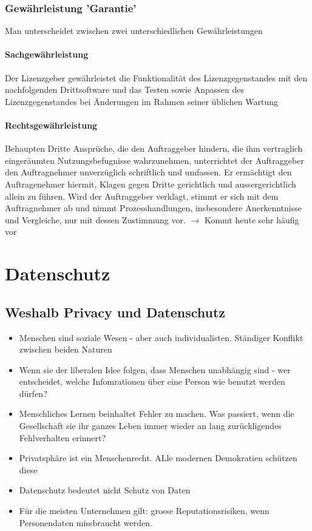 \documentclass{report}
\theoremstyle{definition}
\theoremstyle{example}
\begin{document}
\subsection{Gewährleistung 'Garantie'}
Man unterscheidet zwischen zwei unterschiedlichen Gewährleistungen

\subsubsection{Sachgewährleistung}
Der Lizenzgeber gewährleistet die Funktionalität des Lizenzgegenstandes mit den nachfolgenden Drittsoftware und das Testen sowie Anpassen des Lizenzgegenstandes bei Änderungen im Rahmen seiner üblichen Wartung

\subsubsection{Rechtsgewährleistung}
Behaupten Dritte Ansprüche, die den Auftraggeber hindern, die ihm vertraglich eingeräumten Nutzungsbefugnisse wahrzunehmen, unterrichtet der Auftraggeber den Auftragnehmer unverzüglich schriftlich und umfassen. Er ermächtigt den Auftragenehmer hiermit, Klagen gegen Dritte
gerichtlich und aussergerichtlich allein zu führen. Wird der Auftraggeber verklagt, stimmt er sich mit dem Auftragnehmer ab und nimmt Prozesshandlungen, insbesondere Anerkenntnisse und Vergleiche, nur mit dessen Zustimmung vor.
$\rightarrow$ Kommt heute sehr häufig vor



\chapter{Datenschutz}

\section{Weshalb Privacy und Datenschutz}
\begin{itemize}
   \item Menschen sind soziale Wesen - aber auch individualisten. Ständiger Konflikt zwischen beiden Naturen
   \item Wenn sie der liberalen Idee folgen, dass Menschen unabhängig sind - wer entscheidet, welche Infomrationen über eine Person wie benutzt werden dürfen?
   \item Menschliches Lernen beinhaltet Fehler zu machen. Was passiert, wenn die Gesellschaft sie ihr ganzes Leben immer wieder an lang zurückligendes Fehlverhalten erinnert?
   \item Privatsphäre ist ein Menschenrecht. ALle modernen Demokratien schützen diese
   \item Datenschutz bedeutet nicht Schutz von Daten
   \item Für die meisten Unternehmen gilt: grosse Reputationsrisiken, wenn Personendaten missbraucht werden.
\end{itemize}
\end{document}
